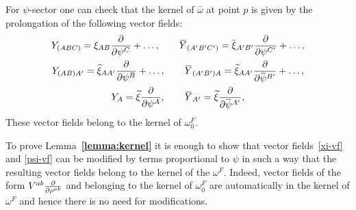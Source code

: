 \documentclass[a4paper,12pt]{article}
\numberwithin{equation}{section} %
\renewcommand{\tilde}{\widetilde}
\newcommand{\bref}[1]{\textbf{\ref{#1}}}
\renewcommand{\d}{\partial}
\newcommand{\ffrac}[2]{\raisebox{.5pt}%
  {\footnotesize$\displaystyle\frac{#1}{#2}$}\kern1pt}
\newcommand{\dl}[1]{\mathchoice{\ffrac{\d}{\d #1}}{\frac{\d}{\d #1}}{\ffrac{\d}{\d #1}}{\ffrac{\d}{\d #1}}}
\numberwithin{equation}{section}
\newcommand{\overbar}[1]{\mkern 1.5mu\overline{\mkern-1.5mu#1\mkern-1.5mu}\mkern 1.5mu}
\newcommand{\psibar}{\overbar{\psi}}
\newcommand{\xitilde}{\tilde{\xi}}
\newcommand{\xibar}{\overbar{\xi}}
\newcommand{\alphadot}{{A^\prime}}
\newcommand{\betadot}{{B^\prime}}
\newcommand{\gammadot}{{C^\prime}}
\newcommand{\B}{{B}}
\newcommand{\C}{{C}}
\begin{document}
\begin{appendix}
For $\psi$-sector one can check that the kernel of $\bar\omega$ at point $p$ is given by the prolongation of the following vector fields:
\begin{equation}
\label{psi-vf}
\begin{gathered}
    Y_{(A\B\C)} = \xi_{A\B}\frac{\partial}{\partial \psi^\C} + \dots , \qquad \overbar{Y}_{(\alphadot\betadot\gammadot)}=\xibar_{\alphadot\betadot}\frac{\partial}{\partial \psi^\gammadot}  + \dots,\\
    Y_{(A\B)\alphadot} = \xitilde_{A\alphadot}\frac{\partial}{\partial \psi^\B}+ \dots, \qquad \overbar{Y}_{(\alphadot\betadot)A} = \xitilde_{A\alphadot}\frac{\partial}{\partial \psibar^\betadot}+ \dots,\\
    Y_A = \xitilde\frac{\partial}{\partial\psi^A}, \qquad   \overbar{Y}_\alphadot = \xitilde\frac{\partial}{\partial\psibar^\alphadot},
\end{gathered}
\end{equation}
These vector fields belong to the kernel of $\omega^F_0$.



To prove Lemma~\bref{lemma:kernel} it is enough to show that vector fields~\eqref{xi-vf}
and \eqref{psi-vf} can be modified by terms proportional to $\psi$ in such a way that the resulting vector fields belong to the kernel of the $\omega^F$. Indeed, vector fields of the form $V^{ab}\dl{\rho^{ab}}$ and belonging to the kernel of $\omega^F_0$ are automatically in the kernel of $\omega^F$ and hence there is no need for modifications.


\end{appendix}
\end{document}
